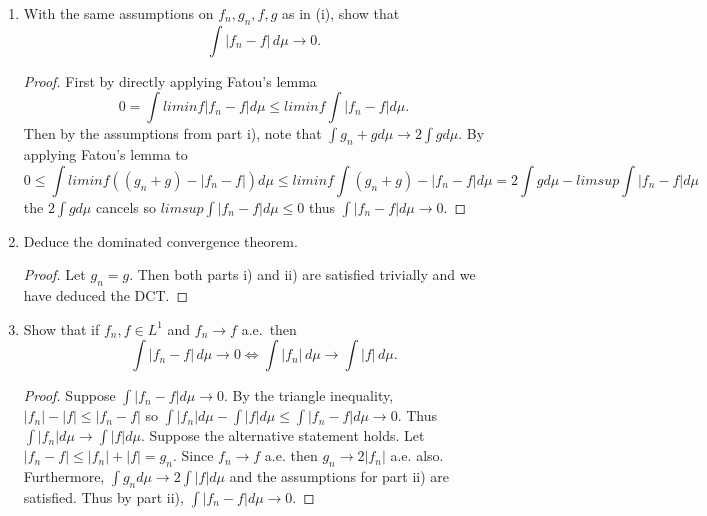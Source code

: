 \documentclass[11pt]{article}
\begin{document}
\begin{enumerate}[leftmargin=*, label=\textbf{\arabic*.}]
\begin{enumerate}[label=(\roman*)]
		            \begin{proof}
			            Since $f_n \to f$ and $g_n \to g$ pointwise then
			            $\int (g +f) d\mu = \int g d\mu + \int f d\mu$
			            Using Fatou's lemma,
			            $$ \int (g + f) d\mu = \int liminf(g_n + f_n)d\mu = \int g d\mu + \int liminf f_nd\mu \leq \int g d\mu + liminf\int f_n d\mu$$
			            and
			            $$ \int liminf (g_n - f_n) d\mu \leq liminf \int (gn-fn)d\mu = liminf(\int g_n d\mu - \int f_n d\mu) = \int g d\mu
				            - limsup \int f_n d\mu.$$

			            Thus, $\int f d\mu = liminf \int f_n d\mu = limsup \int f_n d\mu.$
		            \end{proof}
		      \item With the same assumptions on $f_n, g_n, f, g$ as in (i), show that
		            \[
			            \int |f_n - f|\, d\mu \to 0.
		            \]
		            \begin{proof}
			            First by directly applying Fatou's lemma
			            $$0 =\int liminf |f_n - f| d\mu \leq liminf \int |f_n - f| d\mu.$$
			            Then by the assumptions from part i), note that $\int g_n + g d\mu \to 2\int g d\mu$. By applying Fatou's lemma to
			            $$ 0 \leq \int liminf ((g_n+g) - |f_n - f|) d\mu \leq liminf \int (g_n+g) - |f_n -f| d\mu = 2\int g d\mu - limsup \int|f_n - f| d\mu$$
			            the $2\int g d\mu$ cancels so $limsup \int |f_n - f| d\mu \leq 0$ thus $\int |f_n - f| d\mu \to 0$.
		            \end{proof}

		      \item Deduce the dominated convergence theorem.
		            \begin{proof}
			            Let $g_n = g$. Then both parts i) and ii) are satisfied trivially and we have deduced the DCT.

		            \end{proof}

		      \item Show that if $f_n, f \in L^1$ and $f_n \to f$ a.e.\ then
		            \[
			            \int |f_n - f|\, d\mu \to 0 \iff \int |f_n|\, d\mu \to \int |f|\, d\mu.
		            \]
		            \begin{proof}
			            Suppose $\int |f_n - f| d\mu \to 0$. By the triangle inequality, $|f_n| - |f| \leq |f_n - f|$ so
			            $\int |f_n| d\mu - \int |f| d\mu \leq \int |f_n-f| d\mu \to 0$. Thus $\int |f_n| d\mu \to \int |f| d\mu$.
			            \newline
			            Suppose the alternative statement holds. Let $|f_n - f| \leq |f_n| + |f| = g_n$. Since $f_n \to f$ a.e. then
			            $g_n \to 2|f_n|$ a.e. also. Furthermore, $\int g_n d\mu \to 2 \int |f| d\mu$ and the assumptions for part ii) are satisfied. Thus by part ii), $\int |f_n - f| d\mu \to 0$.
		            \end{proof}
	      \end{enumerate}



\end{enumerate}
\end{document}

